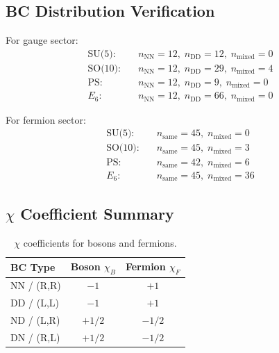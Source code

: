 \documentclass[11pt,a4paper]{article}
\begin{document}
\subsection{BC Distribution Verification}

For gauge sector:
\begin{align}
\label{eq:app-su5-bc}
\text{SU(5):} \quad &n_{\text{NN}} = 12, \; n_{\text{DD}} = 12, \; n_{\text{mixed}} = 0 \\
\label{eq:app-so10-bc}
\text{SO(10):} \quad &n_{\text{NN}} = 12, \; n_{\text{DD}} = 29, \; n_{\text{mixed}} = 4 \\
\label{eq:app-ps-bc}
\text{PS:} \quad &n_{\text{NN}} = 12, \; n_{\text{DD}} = 9, \; n_{\text{mixed}} = 0 \\
\label{eq:app-e6-bc}
E_6: \quad &n_{\text{NN}} = 12, \; n_{\text{DD}} = 66, \; n_{\text{mixed}} = 0
\end{align}

For fermion sector:
\begin{align}
\label{eq:app-su5-ferm-bc}
\text{SU(5):} \quad &n_{\text{same}} = 45, \; n_{\text{mixed}} = 0 \\
\label{eq:app-so10-ferm-bc}
\text{SO(10):} \quad &n_{\text{same}} = 45, \; n_{\text{mixed}} = 3 \\
\label{eq:app-ps-ferm-bc}
\text{PS:} \quad &n_{\text{same}} = 42, \; n_{\text{mixed}} = 6 \\
\label{eq:app-e6-ferm-bc}
E_6: \quad &n_{\text{same}} = 45, \; n_{\text{mixed}} = 36
\end{align}

\subsection{$\chi$ Coefficient Summary}

\begin{table}[h]
\centering
\begin{tabular}{lcc}
\toprule
BC Type & Boson $\chi_B$ & Fermion $\chi_F$ \\
\midrule
NN / (R,R) & $-1$ & $+1$ \\
DD / (L,L) & $-1$ & $+1$ \\
ND / (L,R) & $+1/2$ & $-1/2$ \\
DN / (R,L) & $+1/2$ & $-1/2$ \\
\bottomrule
\end{tabular}
\caption{$\chi$ coefficients for bosons and fermions.}
\label{tab:app-chi}
\end{table}
\end{document}
